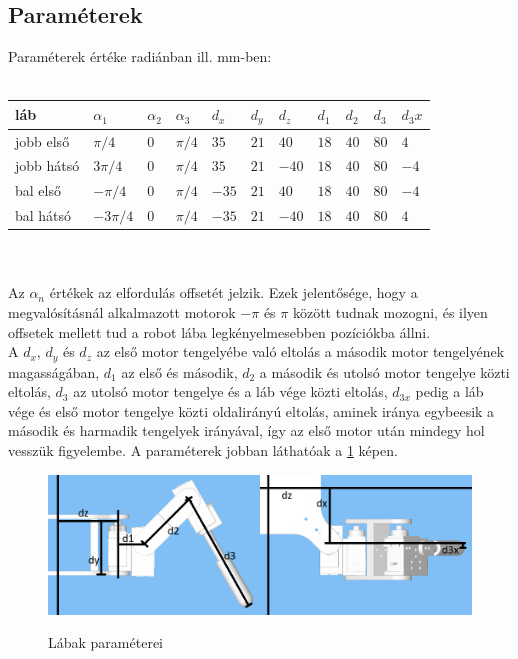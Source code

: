 \documentclass{article}
\begin{document}
\subsection{Paraméterek}
Paraméterek értéke radiánban ill. mm-ben:\\\\
\begin{tabular}{ | l | l | l | l | l | l | l | l | l | l | l | }
	\hline
	láb&$\alpha_1$&$\alpha_2$&$\alpha_3$&$d_x$&$d_y$&$d_z$&$d_1$&$d_2$&$d_3$&$d_3x$\\
	\hline
	jobb első&$\pi/4$&$0$&$\pi/4$&$35$&$21$&$40$&$18$&$40$&$80$&$4$\\
	\hline
	jobb hátsó&$3\pi/4$&$0$&$\pi/4$&$35$&$21$&$-40$&$18$&$40$&$80$&$-4$\\
	\hline
	bal első&$-\pi/4$&$0$&$\pi/4$&$-35$&$21$&$40$&$18$&$40$&$80$&$-4$\\
	\hline
	bal hátsó&$-3\pi/4$&$0$&$\pi/4$&$-35$&$21$&$-40$&$18$&$40$&$80$&$4$\\
	\hline
\end{tabular}\\\\
Az $\alpha_n$ értékek az elfordulás offsetét jelzik. Ezek jelentősége, hogy a megvalósításnál alkalmazott motorok $-\pi$ és $\pi$ között tudnak mozogni, és ilyen offsetek mellett tud a robot lába legkényelmesebben pozíciókba állni.\\
A $d_x$, $d_y$ és $d_z$ az első motor tengelyébe való eltolás a második motor tengelyének magasságában,	$d_1$ az első és második, $d_2$ a második és utolsó motor tengelye közti eltolás, $d_3$ az utolsó motor tengelye és a láb vége közti eltolás, $d_{3x}$ pedig a láb vége és első motor tengelye közti oldalirányú eltolás, aminek iránya egybeesik a második és harmadik tengelyek irányával, így az első motor után mindegy hol vesszük figyelembe. A paraméterek jobban láthatóak a \ref{fig:param} képen.
\begin{figure}
	\caption{Lábak paraméterei}
	\includegraphics[width=\textwidth]{quad_params}
	\label{fig:param}
\end{figure}
\end{document}

